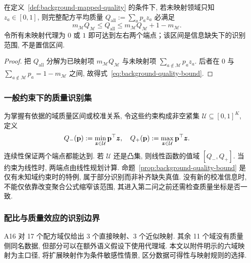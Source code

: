 \begin{proposition}[完整质量的部分识别区间]\label{prop:background-quality-bound}
在定义~\ref{def:background-mapped-quality} 的条件下, 若未映射领域只知 $z_a\in[0, 1]$, 则完整配方平均质量 $Q_{\mathrm{all}}:=\sum_a p_az_a$ 必满足
\begin{equation}\label{eq:background-quality-bound}
m_{\mathcal M}Q_{\mathcal M}
\le Q_{\mathrm{all}}\le
m_{\mathcal M}Q_{\mathcal M}+1-m_{\mathcal M}.
\end{equation}
令所有未映射代理为 $0$ 或 $1$ 即可达到左右两个端点；该区间是信息缺失下的识别范围, 不是置信区间. 
\end{proposition}
\begin{proof}
把 $Q_{\mathrm{all}}$ 分解为已映射项 $m_{\mathcal M}Q_{\mathcal M}$ 与未映射项 $\sum_{a\notin\mathcal M}p_az_a$. 后者在 $0$ 与 $\sum_{a\notin\mathcal M}p_a=1-m_{\mathcal M}$ 之间, 故得式~\eqref{eq:background-quality-bound}. 
\end{proof}


\subsubsection{一般约束下的质量识别集}
为掌握有依据的域质量区间或校准关系, 令这些约束构成非空紧集 $\mathcal U\subseteq[0, 1]^K$, 定义
\begin{equation}\label{eq:q1-general-identification-v37}
Q_-(\mathbf p):=\min_{\boldsymbol z\in\mathcal U}\mathbf p^\top\boldsymbol z, 
\quad
Q_+(\mathbf p):=\max_{\boldsymbol z\in\mathcal U}\mathbf p^\top\boldsymbol z.
\end{equation}
连续性保证两个端点都能达到. 若 $\mathcal U$ 还是凸集, 则线性函数的值域 $[Q_-, Q_+]$. 当约束为线性时, 两端点由线性规划计算. 命题~\ref{prop:background-quality-bound} 是仅有未知域约束时的特例, 属于部分识别而非补齐缺失真值\cite{manski_partial}. 没有新的校准信息时, 不能仅依靠改变聚合公式缩窄该范围, 其进入第二问之前还需检查质量坐标是否一致.

\subsubsection{配比与质量效应的识别边界}
A16 对 17 个配方域仅给出 3 个直接映射、3 个近似映射. 其余 11 个域没有质量侧同名数据, 但部分可以在额外语义假设下使用代理域. 本文以附件明示的六域映射为主口径, 将扩展映射作为条件敏感性情景, 区分数据可得性与映射规则的选择. 

